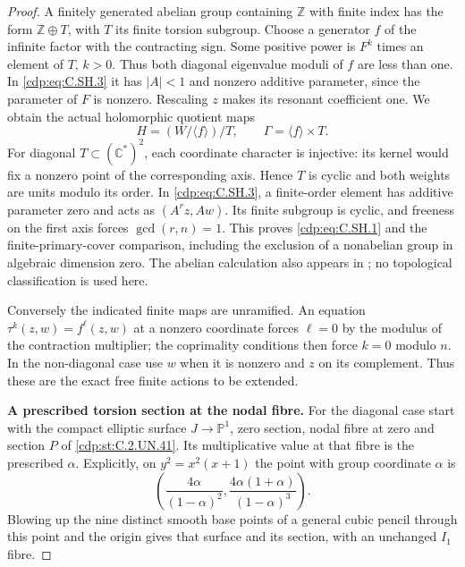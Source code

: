 \begin{proof}
A finitely generated abelian group containing $\mathbb Z$
with finite index has the form $\mathbb Z\oplus T$, with $T$
its finite torsion subgroup. Choose a generator $f$ of the
infinite factor with the contracting sign. Some positive power
is $F^k$ times an element of $T$, $k>0$. Thus both diagonal
eigenvalue moduli of $f$ are less than one. In \eqref{cdp:eq:C.SH.3} it has
$|A|<1$ and nonzero additive parameter, since the parameter
of $F$ is nonzero. Rescaling $z$ makes its resonant coefficient
one. We obtain the actual holomorphic quotient maps
\[
       H=(W/\langle f\rangle)/T,\qquad
       \Gamma=\langle f\rangle\times T.
\tag{C.SH.4}\label{cdp:eq:C.SH.4}
\]
For diagonal $T\subset(\mathbb C^*)^2$, each coordinate
character is injective: its kernel would fix a nonzero point
of the corresponding axis. Hence $T$ is cyclic and both
weights are units modulo its order. In \eqref{cdp:eq:C.SH.3}, a finite-order
element has additive parameter zero and acts as
$(A^r z,Aw)$. Its finite subgroup is cyclic, and freeness
on the first axis forces $\gcd(r,n)=1$. This proves \eqref{cdp:eq:C.SH.1}
and the finite-primary-cover comparison, including the
exclusion of a nonabelian group in algebraic dimension zero.
The abelian calculation also appears in
\cite[\S3, pp.~230--232]{Kato1975Hopf}; no topological
classification is used here.

Conversely the indicated finite maps are unramified.
An equation $\tau^k(z,w)=f^\ell(z,w)$ at a nonzero coordinate
forces $\ell=0$ by the modulus of the contraction multiplier;
the coprimality conditions then force $k=0$ modulo $n$.
In the non-diagonal case use $w$ when it is nonzero and
$z$ on its complement. Thus these are the exact free
finite actions to be extended.

\par\medskip\noindent\textbf{A prescribed torsion section at the nodal fibre.}
For the diagonal case start with the compact elliptic surface
$J\to\mathbb P^1$, zero section, nodal fibre at zero and
section $P$ of \ref{cdp:st:C.2.UN.41}. Its multiplicative value at that
fibre is the prescribed $\alpha$. Explicitly, on
$y^2=x^2(x+1)$ the point with group coordinate $\alpha$ is
\[
 \left(\frac{4\alpha}{(1-\alpha)^2},
       \frac{4\alpha(1+\alpha)}{(1-\alpha)^3}\right).
\tag{C.SH.5}\label{cdp:eq:C.SH.5}
\]
Blowing up the nine distinct smooth base points of a general
cubic pencil through this point and the origin gives that
surface and its section, with an unchanged $I_1$ fibre.


\end{proof}
